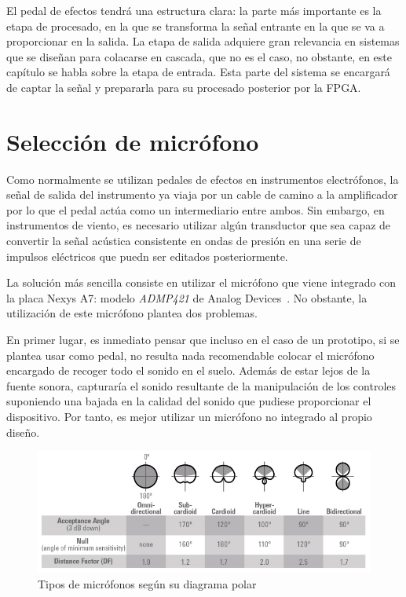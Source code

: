 El pedal de efectos tendrá una estructura clara: la parte más importante es la etapa de procesado, en la que se transforma la señal entrante en la que se va a proporcionar en la salida. La etapa de salida adquiere gran relevancia en sistemas que se diseñan para colacarse en cascada, que no es el caso, no obstante, en este capítulo se habla sobre la etapa de entrada. Esta parte del sistema se encargará de captar la señal y prepararla para su procesado posterior por la FPGA.

\section{Selección de micrófono}

Como normalmente se utilizan pedales de efectos en instrumentos electrófonos, la señal de salida del instrumento ya viaja por un cable de camino a la amplificador por lo que el pedal actúa como un intermediario entre ambos. Sin embargo, en instrumentos de viento, es necesario utilizar algún transductor que sea capaz de convertir la señal acústica consistente en ondas de presión en una serie de impulsos eléctricos que puedn ser editados posteriormente.

La solución más sencilla consiste en utilizar el micrófono que viene integrado con la placa Nexys A7: modelo \emph{ADMP421} de Analog Devices~\cite{Nexys}. No obstante, la utilización de este micrófono plantea dos problemas.

En primer lugar, es inmediato pensar que incluso en el caso de un prototipo, si se plantea usar como pedal, no resulta nada recomendable colocar el micrófono encargado de recoger todo el sonido en el suelo. Además de estar lejos de la fuente sonora, capturaría el sonido resultante de la manipulación de los controles suponiendo una bajada en la calidad del sonido que pudiese proporcionar el dispositivo. Por tanto, es mejor utilizar un micrófono no integrado al propio diseño.

\begin{figure}
\begin{center}
\includegraphics[width=15cm]{img/micros.png}
\caption{\label{fig:polar_dig}Tipos de micrófonos según su diagrama polar~\cite{Mic}}
\end{center}
\end{figure}

